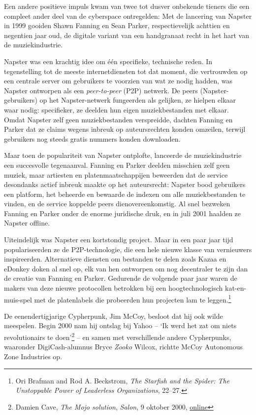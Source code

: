 \documentclass[
  a5paper,
  smalldemyvopaper,11pt,twoside,onecolumn,openright,extrafontsizes,
hidelinks]{memoir}
\begin{document}
Een andere positieve impuls kwam van twee tot dusver onbekende tieners
die een compleet ander deel van de cyberspace ontregelden: Met de
lancering van Napster in 1999 gooiden Shawn Fanning en Sean Parker,
respectievelijk achttien en negentien jaar oud, de digitale variant van
een handgranaat recht in het hart van de muziekindustrie.

Napster was een krachtig idee om één specifieke, technische reden. In
tegenstelling tot de meeste internetdiensten tot dat moment, die
vertrouwden op een centrale server om gebruikers te voorzien van wat ze
nodig hadden, was Napster ontworpen als een \emph{peer-to-peer} (P2P)
netwerk. De peers (Napster-gebruikers) op het Napster-netwerk fungeerden
als gelijken, ze hielpen elkaar waar nodig: specifieker, ze deelden hun
eigen muziekbestanden met elkaar. Omdat Napster zelf geen
muziekbestanden verspreidde, dachten Fanning en Parker dat ze claims
wegens inbreuk op auteursrechten konden omzeilen, terwijl gebruikers nog
steeds gratis nummers konden downloaden.

Maar toen de populariteit van Napster ontplofte, lanceerde de
muziekindustrie een succesvolle tegenaanval. Fanning en Parker deelden
misschien zelf geen muziek, maar artiesten en platenmaatschappijen
beweerden dat de service desondanks actief inbreuk maakte op het
auteursrecht: Napster bood gebruikers een platform, het beheerde en
bewaarde de indexen om alle muziekbestanden te vinden, en de service
koppelde peers dienovereenkomstig. Al snel bezweken Fanning en Parker
onder de enorme juridische druk, en in juli 2001 haalden ze Napster
offline.

Uiteindelijk was Napster een kortstondig project. Maar in een paar jaar
tijd populariseerden ze de P2P-technologie, die een hele nieuwe klasse
van vernieuwers inspireerden. Alternatieve diensten om bestanden te
delen zoals Kazaa en eDonkey doken al snel op, elk van hen ontworpen om
nog decentraler te zijn dan de creatie van Fanning en Parker. Gedurende
de volgende paar jaar waren de makers van deze nieuwe protocollen
betrokken bij een hoogtechnologisch kat-en-muis-spel met de platenlabels
die probeerden hun projecten lam te leggen.\footnote{Ori Brafman and Rod
  A. Beckstrom, \emph{The Starfish and the Spider: The Unstoppable Power
  of Leaderless Organizations}, 22--27.}

De eenendertigjarige Cypherpunk, Jim McCoy, besloot dat hij ook wilde
meespelen. Begin 2000 nam hij ontslag bij Yahoo -- `Ik werd het zat om
niets revolutionairs te doen'\footnote{Damien Cave, \emph{The Mojo
  solution}, \emph{Salon}, 9 oktober 2000,
  \href{https://www.salon.com/2000/10/09/mojo_nation/}{online}} -- en
samen met verschillende andere Cypherpunks, waaronder DigiCash-alumnus
Bryce \emph{Zooko} Wilcox, richtte McCoy Autonomous Zone Industries op.
\end{document}
